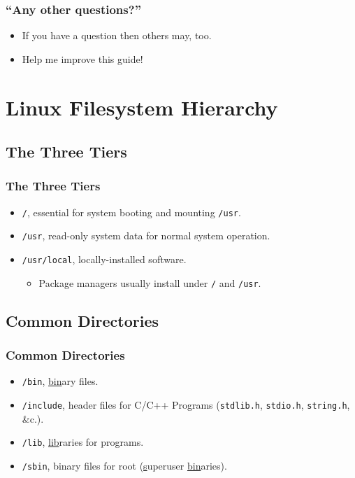 \documentclass[xcolor={dvipsnames,svgnames},hyperref=dvips]{beamer}
\begin{document}
	\begin{frame}
		\frametitle{``Any other questions?''}
		\begin{itemize}
		\item If you have a question then others may, too.
		\item Help me improve this guide!
		\end{itemize}
	\end{frame}

\section{Linux Filesystem Hierarchy}\label{section:lfsh}
	\subsection{The Three Tiers}
	\begin{frame}
		\frametitle{The Three Tiers}
		\begin{itemize}
		\item \texttt{/}, essential for system booting and mounting \texttt{/usr}.
		\item \texttt{/usr}, read-only system data for normal system operation.
		\item \texttt{/usr/local}, locally-installed software.
			\begin{itemize}
			\item Package managers usually install under \texttt{/} and \texttt{/usr}.
			\end{itemize}
		\end{itemize}
	\end{frame}

	\subsection{Common Directories}
	\begin{frame}
		\frametitle{Common Directories}
		\begin{itemize}
		\item \texttt{/bin}, \underline{bin}ary files.
		\item \texttt{/include}, header files for C/C++ Programs (\texttt{stdlib.h}, \texttt{stdio.h}, \texttt{string.h}, \&c.).
		\item \texttt{/lib}, \underline{lib}raries for programs.
		\item \texttt{/sbin}, binary files for root (\underline{s}uperuser \underline{bin}aries).
		\end{itemize}
	\end{frame}
\end{document}
